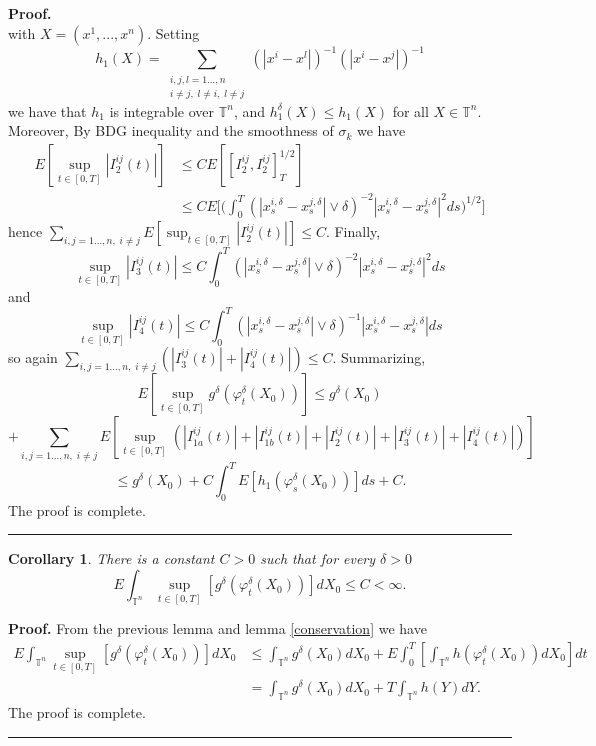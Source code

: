 \documentclass[11pt,a4paper]{article}%
\newtheorem{corollary}[theorem]{Corollary}
\newenvironment{proof}[1][Proof]{\textbf{#1.} }{\ \rule{0.5em}{0.5em}}
\begin{document}
\begin{proof}
\[\]
with $X=( x^{1},...,x^{n}) $. Setting
\[
h_{1}( X) =\sum_{\substack{i,j,l=1...,n\\i\neq j,\;l\neq i,\;l\neq j}}( |
x^{i}-x^{l}| ) ^{-1}( | x^{i}-x^{j}| ) ^{-1}%
\]
we have that $h_{1}$ is integrable over ${\mathbb{T}}^{n}$, and $h_{1}%
^{\delta}( X) \leq h_{1}( X) $ for all $X\in{\mathbb{T}}^{n}$. Moreover, By
BDG inequality and the smoothness of $\sigma_{k}$ we have
\begin{align*}
E\left[  \sup_{t\in\left[  0,T\right]  }\left|  I_{2}^{ij}\left(  t\right)
\right|  \right]   &  \leq CE\left[  \left[  I_{2}^{ij},I_{2}^{ij}\right]
^{1/2} _{T}\right] \\
&  \leq C E \Big [ \Big(\int_{0}^{T}\left(  \left|  x_{s}^{i,\delta}%
-x_{s}^{j,\delta}\right|  \vee\delta\right)  ^{-2}\left|  x_{s}^{i,\delta
}-x_{s}^{j,\delta}\right|  ^{2}ds \Big)^{1/2} \Big]
\end{align*}
hence
$
\sum_{i,j=1...,n,\;i\neq j}E[ \sup_{t\in[ 0,T] }| I_{2}^{ij}( t) | ] \leq C
$.
Finally,
\[
 \sup_{t\in [  0,T ]  }  |  I_{3}^{ij}(  t)  |  \leq C\int_{0}^{T}(  |
x_{s}^{i,\delta}-x_{s}^{j,\delta}|  \vee\delta)  ^{-2}|
x_{s}^{i,\delta}-x_{s}^{j,\delta}|  ^{2}ds
\]
and
\[
 \sup_{t\in [  0,T ]  } |  I_{4}^{ij}(  t)  |  \leq C\int_{0}^{T}(  |
x_{s}^{i,\delta}-x_{s}^{j,\delta}|  \vee\delta)  ^{-1}|
x_{s}^{i,\delta}-x_{s}^{j,\delta}| ds
\]
so again
$
\sum_{i,j=1...,n,\;i\neq j}(| I_{3}^{ij}( t) |+| I_{4}^{ij}( t) |) \leq C
$.
Summarizing,
\[
E\left[  \sup_{t\in\left[  0,T\right]  }g^{\delta}\left(  \varphi_{t}^{\delta
}\left(  X_{0}\right)  \right)  \right]  \leq g^{\delta}\left(  X_{0}\right)
\]%
\[
+\sum_{i,j=1...,n,\;i\neq j}E [  \sup_{t\in [  0,T ]  } (
 |  I_{1a}^{ij} (  t )   |  +  |  I_{1b}^{ij} (
t )   |  + |  I_{2}^{ij} (  t )   |  + |
I_{3}^{ij} (  t )   |  + |
I_{4}^{ij} (  t )   |   )   ]
\]%
\[
\leq g^{\delta}\left(  X_{0}\right)  + C\int_{0}^{T}E\left[  h_{1}\left(
\varphi_{s}^{\delta}\left(  X_{0}\right)  \right)  \right]  ds+C.
\]
The proof is complete.
\end{proof}

\begin{corollary}
There is a constant $C>0$ such that for every $\delta>0$%
\[
E\int_{{\mathbb{T}}^{n}}\sup_{t\in[ 0,T] }[ g^{\delta}( \varphi_{t}^{\delta}(
X_{0}) ) ] dX_{0}\leq C<\infty.
\]

\end{corollary}

\begin{proof}
From the previous lemma and lemma \ref{conservation} we have
\begin{align*}
E\int_{{\mathbb{T}}^{n}}\sup_{t\in[ 0,T] }[ g^{\delta}( \varphi_{t}^{\delta}(
X_{0}) ) ] dX_{0}%
& \leq\int_{{\mathbb{T}}^{n}}g^{\delta}( X_{0}) dX_{0}+E\int_{0}^{T}[
\int_{{\mathbb{T}}^{n}}h( \varphi_{t}^{\delta}( X_{0}) ) dX_{0}] dt\\
&  =\int_{{\mathbb{T}}^{n}}g^{\delta}( X_{0}) dX_{0}+T\int_{{\mathbb{T}}^{n}%
}h( Y) dY.
\end{align*}
The proof is complete.
\end{proof}
\end{document}
